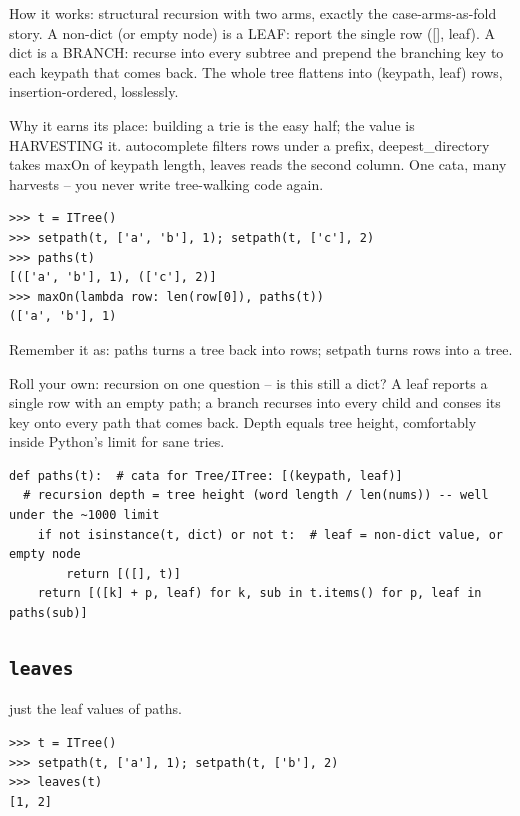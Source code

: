 \documentclass[10pt,letterpaper]{book}
\begin{document}
How it works: structural recursion with two arms, exactly the case-arms-as-fold story. A non-dict (or empty node) is a LEAF: report the single row ([], leaf). A dict is a BRANCH: recurse into every subtree and prepend the branching key to each keypath that comes back. The whole tree flattens into (keypath, leaf) rows, insertion-ordered, losslessly.


Why it earns its place: building a trie is the easy half; the value is HARVESTING it. autocomplete filters rows under a prefix, deepest\_directory takes maxOn of keypath length, leaves reads the second column. One cata, many harvests -- you never write tree-walking code again.

\begin{lstlisting}[style=ex]
>>> t = ITree()
>>> setpath(t, ['a', 'b'], 1); setpath(t, ['c'], 2)
>>> paths(t)
[(['a', 'b'], 1), (['c'], 2)]
>>> maxOn(lambda row: len(row[0]), paths(t))
(['a', 'b'], 1)
\end{lstlisting}

Remember it as: paths turns a tree back into rows; setpath turns rows into a tree.


Roll your own: recursion on one question -- is this still a dict? A leaf reports a single row with an empty path; a branch recurses into every child and conses its key onto every path that comes back. Depth equals tree height, comfortably inside Python's limit for sane tries.

\begin{lstlisting}[style=ex]
def paths(t):  # cata for Tree/ITree: [(keypath, leaf)]
  # recursion depth = tree height (word length / len(nums)) -- well under the ~1000 limit
    if not isinstance(t, dict) or not t:  # leaf = non-dict value, or empty node
        return [([], t)]
    return [([k] + p, leaf) for k, sub in t.items() for p, leaf in paths(sub)]
\end{lstlisting}

\subsection{\texttt{leaves}}\label{def:leaves}
just the leaf values of paths.
\begin{lstlisting}[style=ex]
>>> t = ITree()
>>> setpath(t, ['a'], 1); setpath(t, ['b'], 2)
>>> leaves(t)
[1, 2]
\end{lstlisting}
\end{document}
